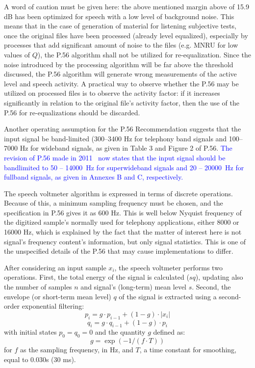 A word of caution must be given here: the above mentioned margin above
of 15.9 dB has been optimized for speech with a low level of
background noise. This means that in the case of generation of
material for listening subjective tests, once the original files have
been processed (already level equalized), especially by processes that
add significant amount of noise to the files (e.g. MNRU for low values
of $Q$), the P.56 algorithm shall not be utilized for re-equalization.
Since the noise introduced by the processing algorithm will be far
above the threshold discussed, the P.56 algorithm will generate wrong
measurements of the active level and speech activity. A practical way
to observe whether the P.56 may be utilized on processed files is to
observe the activity factor: if it increases significantly in relation
to the original file's activity factor, then the use of the P.56 for
re-equalizations should be discarded.

Another operating assumption for the P.56 Recommendation suggests that
the input signal be band-limited (300--3400 Hz for telephony band
signals and 100--7000 Hz for wideband signals, as given in Table 3 and
Figure 2 of P.56. \textcolor{blue}{The revision of P.56 made in
2011~\cite{P.56-rev} now states that the input signal should be
bandlimited to 50 -- 14000~Hz for superwideband signals and 20 --
20000~Hz for fullband signals, as given in Annexes B and C,
respectively.}

The speech voltmeter algorithm is expressed in terms of discrete
operations. Because of this, a minimum sampling frequency must be
chosen, and the specification in P.56 gives it as 600 Hz. This is
well below Nyquist frequency of the digitized sample's normally used
for telephony applications, either 8000 or 16000 Hz, which is
explained by the fact that the matter of interest here is not
signal's frequency content's information, but only signal statistics.
This is one of the unspecified details of the P.56 that may cause
implementations to differ.

After considering an input sample $x_i$, the speech voltmeter performs
two operations. First, the total energy of the signal is calculated
($sq$), updating also the number of samples $n$ and signal's
(long-term) mean level $s$. Second, the envelope (or short-term mean
level) $q$ of the signal is extracted using a second-order exponential
filtering:
\[
p_i = g \cdot p_{i-1} + (1-g) \cdot | x_i | 
\]
\[
q_i = g \cdot q_{i-1} + (1-g) \cdot p_i
\]
with initial states $p_0=q_0=0$ and the quantity $g$ defined as:
\[
g = \exp(-1/(f \cdot T))
\]
for $f$ as the sampling frequency, in Hz, and $T$, a time constant for
smoothing, equal to 0.030s (30 ms).

